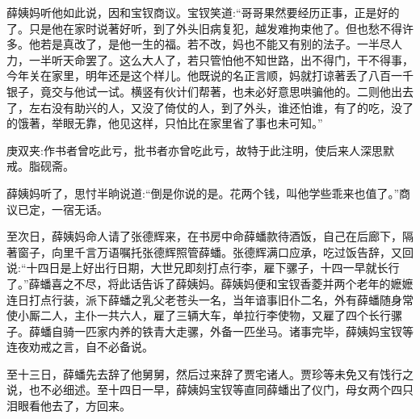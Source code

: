 \begin{parag}
    薛姨妈听他如此说，因和宝钗商议。宝钗笑道:“哥哥果然要经历正事，正是好的了。只是他在家时说著好听，到了外头旧病复犯，越发难拘束他了。但也愁不得许多。他若是真改了，是他一生的福。若不改，妈也不能又有别的法子。一半尽人力，一半听天命罢了。这么大人了，若只管怕他不知世路，出不得门，干不得事，今年关在家里，明年还是这个样儿。他既说的名正言顺，妈就打谅著丢了八百一千银子，竟交与他试一试。横竖有伙计们帮著，也未必好意思哄骗他的。二则他出去了，左右没有助兴的人，又没了倚仗的人，到了外头，谁还怕谁，有了的吃，没了的饿著，举眼无靠，他见这样，只怕比在家里省了事也未可知。”\begin{note}庚双夹:作书者曾吃此亏，批书者亦曾吃此亏，故特于此注明，使后来人深思默戒。脂砚斋。\end{note}薛姨妈听了，思忖半晌说道:“倒是你说的是。花两个钱，叫他学些乖来也值了。”商议已定，一宿无话。
\end{parag}


\begin{parag}
    至次日，薛姨妈命人请了张德辉来，在书房中命薛蟠款待酒饭，自己在后廊下，隔著窗子，向里千言万语嘱托张德辉照管薛蟠。张德辉满口应承，吃过饭告辞，又回说:“十四日是上好出行日期，大世兄即刻打点行李，雇下骡子，十四一早就长行了。”薛蟠喜之不尽，将此话告诉了薛姨妈。薛姨妈便和宝钗香菱并两个老年的嬷嬷连日打点行装，派下薛蟠之乳父老苍头一名，当年谙事旧仆二名，外有薛蟠随身常使小厮二人，主仆一共六人，雇了三辆大车，单拉行李使物，又雇了四个长行骡子。薛蟠自骑一匹家内养的铁青大走骡，外备一匹坐马。诸事完毕，薛姨妈宝钗等连夜劝戒之言，自不必备说。
\end{parag}


\begin{parag}
    至十三日，薛蟠先去辞了他舅舅，然后过来辞了贾宅诸人。贾珍等未免又有饯行之说，也不必细述。至十四日一早，薛姨妈宝钗等直同薛蟠出了仪门，母女两个四只泪眼看他去了，方回来。
\end{parag}


